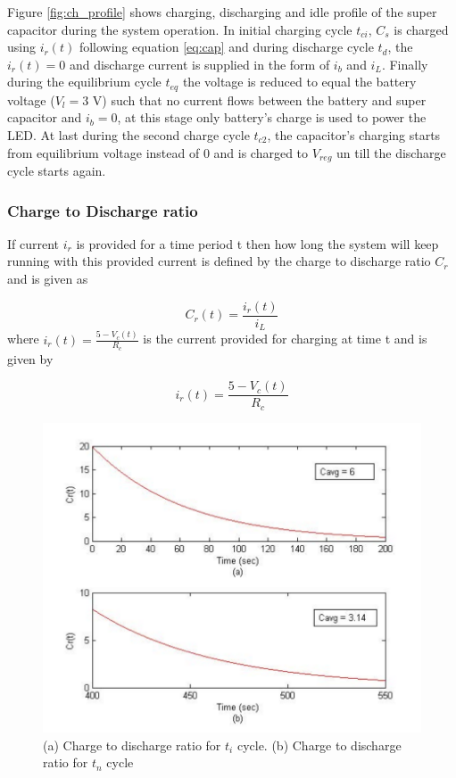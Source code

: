Figure \ref{fig:ch_profile} shows charging, discharging and idle profile of the super capacitor during the system operation. In initial charging cycle $t_{ci}$, $C_s$ is charged using $i_r(t)$ following equation \ref{eq:cap} and during discharge cycle $t_d$, the $i_r(t) = 0$ and discharge current is supplied in the form of $i_b$ and $i_L$. Finally during the equilibrium cycle $t_{eq}$ the voltage is reduced to equal the battery voltage ($V_l = 3$ V) such that no current flows between the battery and super capacitor and $i_b = 0$, at this stage only battery's charge is used to power the LED. At last during the second charge cycle $t_{c2}$, the capacitor's charging starts from equilibrium voltage instead of 0 and is charged to $V_{reg}$ un till the discharge cycle starts again.





\subsubsection{Charge to Discharge ratio}
If current $i_r$ is provided for a time period t then how long the system will keep running with this provided current is defined by the charge to discharge ratio $C_r$ and is given as

\begin{equation}\label{eq:cdr}
 C_r(t) = \frac{i_r(t)}{i_L}
\end{equation}
where $i_r(t) = \frac {5-V_c(t)}{R_c}$ is the current provided for charging at time t and is given by

\begin{equation}\label{eq:ir}
 i_r(t) = \frac {5-V_c(t)}{R_c}
\end{equation}





\begin{figure}[h!]
\centering
\includegraphics[width=1\textwidth]{ctd2.pdf}
\caption{(a) Charge to discharge ratio for $t_i$ cycle. (b) Charge to discharge ratio for $t_n$ cycle}
\label{fig:crs}
\end{figure}

